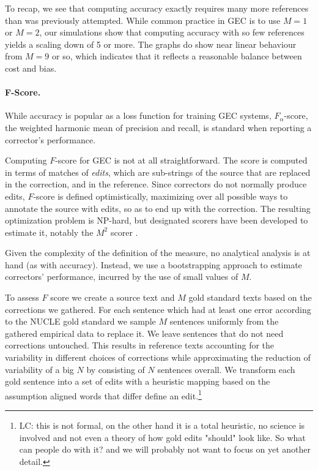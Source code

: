 \documentclass[letter,11pt]{article}
\newcommand{\lc}[1]{\footnote{\color{green}LC: #1}}
\begin{document}
		To recap, we see that computing accuracy exactly requires many more references than was previously attempted.
		While common practice in GEC is to use $M=1$ or $M=2$, our simulations show that computing accuracy with
		so few references yields a scaling down of 5 or more. The graphs do show near linear behaviour from $M=9$ or
		so, which indicates that it reflects a reasonable balance between cost and bias.
		
		\paragraph{F-Score.}
		While accuracy is popular as a loss function for training GEC systems,
		$F_\alpha$-score, the weighted harmonic mean of precision and recall, is standard when reporting a corrector's performance.
		
		Computing $F$-score for GEC is not at all straightforward. The score is computed
		in terms of matches of {\it edits}, which are sub-strings of the source
		that are replaced in the correction, and in the reference. Since correctors
		do not normally produce edits, $F$-score is defined optimistically, maximizing
		over all possible ways to annotate the source with edits, so as to end up with the correction. 
		The resulting optimization problem is NP-hard, but designated scorers
		have been developed to estimate it, notably the $M^2$ scorer
		\cite{dahlmeier2012better}.
		
		Given the complexity of the definition of the measure, no analytical analysis is at hand (as with accuracy). Instead, we use a bootstrapping
		approach to estimate correctors' performance,
		incurred by the use of small values of $M$.
		
		To assess $F$ score we create a source text and $M$ gold standard texts based on the corrections we gathered.
		For each sentence which had at least one error according to the NUCLE gold standard we sample $M$ sentences uniformly from the
		gathered empirical data to replace it. We leave sentences that do not need corrections untouched. This results in reference texts accounting for the variability in different choices of corrections while approximating the reduction of variability of a big $N$ by consisting of $N$ sentences overall.
		We transform each gold sentence into a set of edits with a heuristic mapping based on the assumption aligned words that differ define an edit.\lc{this is not formal, on the other hand it is a total heuristic, no science is involved and not even a theory of how gold edits "should" look like. So what can people do with it? and we will probably not want to focus on yet another detail.}
		
\end{document}
